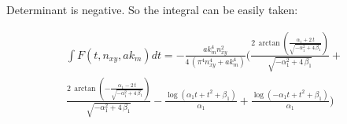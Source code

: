 \documentclass[twoside, 10pt]{article}
\begin{document}
\begin{multicols}{2}
    Determinant is negative. So the integral can be easily taken:

\noindent
    \[\begin{array}{r} \int F\left(t, n_{xy}, ak_m\right) dt = -\frac{\mathit{ak}_{m}^{4} n_{\mathit{xy}}^{2}}{4 \, {\left(\pi^{4} n_{\mathit{xy}}^{4} + \mathit{ak}_{m}^{4}\right)}} \Bigg(\frac{2 \, \arctan\left(\frac{\alpha_{1} + 2 \, t}{\sqrt{-\alpha_{1}^{2} + 4 \, \beta_{1}}}\right)}{\sqrt{-\alpha_{1}^{2} + 4 \, \beta_{1}}} + \\ \frac{2 \, \arctan\left(-\frac{\alpha_{1} - 2 \, t}{\sqrt{-\alpha_{1}^{2} + 4 \, \beta_{1}}}\right)}{\sqrt{-\alpha_{1}^{2} + 4 \, \beta_{1}}} - \frac{\log\left(\alpha_{1} t + t^{2} + \beta_{1}\right)}{\alpha_{1}} + \frac{\log\left(-\alpha_{1} t + t^{2} + \beta_{1}\right)}{\alpha_{1}}\Bigg) \end{array}\]







\end{multicols}
\end{document}
